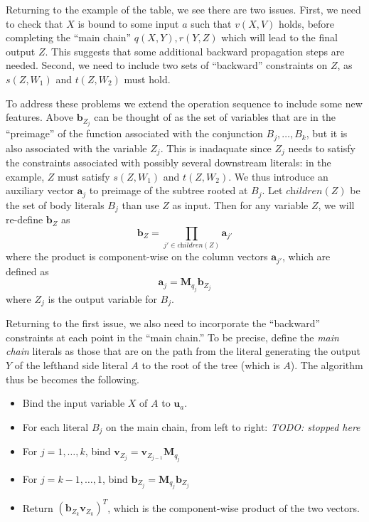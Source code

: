 \documentclass[12pt]{article}
\newcommand{\yy}[1]{\textit{TODO: {#1}}}
\newcommand{\trm}[1]{\textit{#1}}
\newcommand{\vek}[1]{\textbf{#1}}
\newcommand{\M}{\textbf{M}}
\newcommand{\children}{\textit{children}}
\begin{document}
Returning to the example of the table, we see there are two issues.
First, we need to check that $X$ is bound to some input $a$ such that
$v(X,V)$ holds, before completing the ``main chain'' $q(X,Y),r(Y,Z)$
which will lead to the final output $Z$.  This suggests that some
additional backward propagation steps are needed.  Second, we need to
include two sets of ``backward'' constraints on $Z$, as $s(Z,W_1)$ and
$t(Z,W_2)$ must hold.

To address these problems we extend the operation sequence to include
some new features.  Above $\vek{b}_{Z_{j}}$ can be thought of as the
set of variables that are in the ``preimage'' of the function
associated with the conjunction $B_j,\ldots,B_k$, but it is also
associated with the variable $Z_j$.  This is inadaquate since $Z_j$
needs to satisfy the constraints associated with possibly several
downstream literals: in the example, $Z$ must satisfy $s(Z,W_1)$ and
$t(Z,W_2)$.  We thus introduce an auxiliary vector $\vek{a}_j$ to
preimage of the subtree rooted at $B_j$. Let $\children(Z)$ be the set
of body literals $B_j$ than use $Z$ as input. Then for any variable
$Z$, we will re-define $\vek{b}_Z$ as
\[ \vek{b}_Z = \prod_{j' \in \children(Z)} \vek{a}_{j'}
\]
where the product is component-wise on the column vectors $\vek{a}_{j'}$,
which are defined as 
\[ \vek{a}_{j} = \M_{q_j} \vek{b}_{Z_j}
\] 
where $Z_j$ is the output variable for $B_j$.

Returning to the first issue, we also need to incorporate the
``backward'' constraints at each point in the ``main chain.''  To be
precise, define the \trm{main chain} literals as those that are on the
path from the literal generating the output $Y$ of the lefthand side
literal $A$ to the root of the tree (which is $A$).  The algorithm
thus be becomes the following.

\begin{itemize}
\item Bind the input variable $X$ of $A$ to $\vek{u}_a$.
\item For each literal $B_j$ on the main chain, from left to right:
   \yy{stopped here}
\item For $j=1,\ldots,k$, bind $\vek{v}_{Z_j} = \vek{v}_{Z_{j-1}} \M_{q_j}$
\item For $j=k-1,\ldots,1$, bind $\vek{b}_{Z_j} = \M_{q_j} \vek{b}_{Z_j}$
\item Return $(\vek{b}_{Z_{k}} \vek{v}_{Z_{k}})^T$, which is the
  component-wise product of the two vectors.
\end{itemize}
\end{document}
